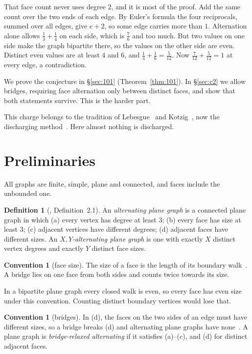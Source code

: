 \documentclass{amsart}
\theoremstyle{plain}
\theoremstyle{definition}
\newtheorem{definition}[theorem]{Definition}
\newtheorem{convention}[theorem]{Convention}
\theoremstyle{remark}
\begin{document}
That face count never uses degree $2$, and it is most of the proof. Add the same
count over the two ends of each edge. By Euler's formula the four reciprocals,
summed over all edges, give $e+2$, so some edge carries more than $1$.
Alternation alone allows $\frac13+\frac14$ on each side, which is $\frac76$ and
too much. But two values on one side make the graph bipartite there, so the
values on the other side are even. Distinct even values are at least $4$ and
$6$, and $\frac14+\frac16=\frac5{12}$. Now $\frac7{12}+\frac5{12}=1$ at every
edge, a contradiction.

We prove the conjecture in \S\ref{sec:101} (Theorem~\ref{thm:101}). In
\S\ref{sec:c2} we allow bridges, requiring face alternation only between
distinct faces, and show that both statements survive. This is the harder part.

This charge belongs to the tradition of Lebesgue~\cite{Lebesgue1940} and
Kotzig~\cite{Kotzig1955}, now the discharging method~\cite{CW2017, JV2013}.
Here almost nothing is discharged.

\section{Preliminaries}\label{sec:prelim}

All graphs are finite, simple, plane and connected, and faces include the
unbounded one.

\begin{definition}[\cite{AHSSV2015}, Definition~2.1]\label{def:apg}
An \emph{alternating plane graph} is a connected plane graph in which
(a) every vertex has degree at least $3$; (b) every face has size at least $3$;
(c) adjacent vertices have different degrees; (d) adjacent faces have different
sizes. An \emph{$X,Y$-alternating plane graph} is one with exactly $X$ distinct
vertex degrees and exactly $Y$ distinct face sizes.
\end{definition}

\begin{convention}[face size]\label{conv:c1}
The size of a face is the length of its boundary walk~\cite[\S3.3]{MT2001}. A
bridge lies on one face from both sides and counts twice towards its size.
\end{convention}

In a bipartite plane graph every closed walk is even, so every face has even
size under this convention. Counting distinct boundary vertices would lose that.

\begin{convention}[bridges]\label{conv:c2}
In (d), the faces on the two sides of an edge must have different sizes, so a
bridge breaks (d) and alternating plane graphs have none~\cite{AHSSV2015}. A
plane graph is \emph{bridge-relaxed alternating} if it satisfies (a)--(c), and
(d) for distinct adjacent faces.
\end{convention}
\end{document}
